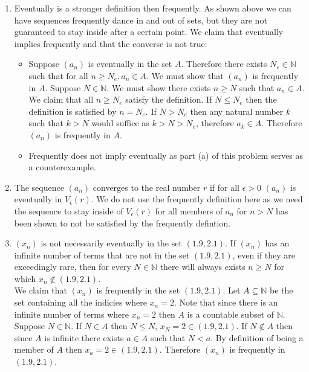 \documentclass[12pt, letterpaper]{article}
\newcommand{\N}{\mathbb{N}}
\begin{document}
\begin{enumerate}
\begin{enumerate}
			\item Eventually is a stronger definition then frequently.  As shown above we can have sequences frequently dance in and out of sets, but they are not guaranteed to stay inside after a certain point.  We claim that eventually implies frequently and that the converse is not true:
			\begin{itemize}
				\item Suppose $(a_n)$ is eventually in the set $A$.  Therefore
				 there exists $N_e \in \N$ such that for all $n \geq N_e, a_n \in 
				 A$.  We must show
				 that $(a_n)$ is frequently in $A$.  Suppose $N \in \N$.  We must
				 show there exists $n \geq N$ such that $a_n \in A$.  We claim
				 that all $n \geq N_e$ satisfy the definition.    If $N \leq N_e$
				 then the definition is satisfied by $n = N_e$.  If $N > N_e$ then any natural number $k$ such that $k > N$ would suffice as $k > N > N_e$, therefore 
				 $a_k \in A$.  Therefore $(a_n)$ is frequently in $A$.  
				 \item Frequently does not imply eventually as part (a) of this problem serves as a counterexample.  
			\end{itemize}
			\item The sequence $(a_n)$ converges to the real number $r$ if for all 
			$\epsilon > 0$ $(a_n)$ is eventually in $V_{\epsilon}(r)$.  
			We do not use the frequently definition here as we need the sequence 
			to stay inside of $V_{\epsilon}(r)$ for all members of $a_n$ for 
			$n > N$ has been shown to not be satisfied by the frequently defintion.
			\item $(x_n)$ is not necessarily eventually in the set $(1.9,2.1)$.  If $(x_n)$ has an infinite number of terms that are not in the set $(1.9,2.1)$, even if they are exceedingly rare, then for every $N \in \N$ there will always exists $n \geq N$ for which $x_n \not \in (1.9,2.1)$.  \\
			We claim that $(x_n)$ is frequently in the set $(1.9,2.1)$.  Let $A \subseteq \N$ be the set containing all the indicies where $x_n = 2$.  Note that 
			since there is an infinite number of terms where $x_n = 2$ then $A$ is
			a countable subset of $\N$.  Suppose $N \in \N$.  If $N \in A$ then 
			$N \leq N$, $x_N = 2 \in (1.9,2.1)$.  If $N \not \in A$ then since $A$ is infinite there exists $a \in A$ such that $N < a$. By definition of being a 
			member of $A$ then $x_a = 2\in (1.9,2.1)$.  Therefore $(x_n)$ is frequently in $(1.9,2.1)$.     
		\end{enumerate}
	\end{enumerate}
\end{document}
